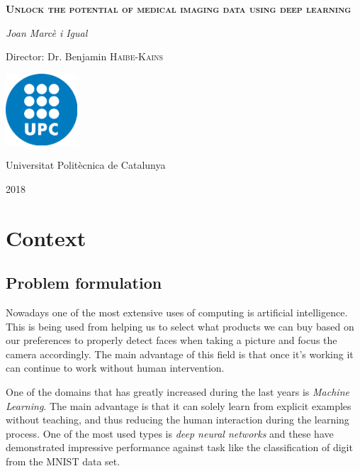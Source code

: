 \documentclass[a4paper]{article}
\begin{document}
\begin{titlepage}
    \centering
	\vspace{1.5cm}
	{\huge \textbf{\textsc{Unlock the potential of medical imaging data using deep learning}} \par}
	\vspace{2cm}
	{\Large\itshape Joan Marcè i Igual\par}
	\vfill
    Director: Dr. Benjamin \textsc{Haibe-Kains}
    
    \vfill

    \includegraphics[width=0.2\textwidth]{images/logo_upc}\par\vspace{1cm}
	\vfill
    
    {\LARGE Universitat Politècnica de Catalunya \par}
    {\LARGE 2018 \par}
\end{titlepage}

\tableofcontents

\section{Context}

\subsection{Problem formulation}

Nowadays one of the most extensive uses of computing is artificial intelligence. This is being
used from helping us to select what products we can buy based on our preferences to properly detect
faces when taking a picture and focus the camera accordingly. The main advantage of this field is
that once it's working it can continue to work without human intervention.

One of the domains that has greatly increased during the last years is \emph{Machine Learning}.
The main advantage is that it can solely learn from explicit examples without
teaching, and thus reducing the human interaction during the learning process. One of the most used
types is \emph{deep neural networks} and these have demonstrated impressive performance against
task like the classification of digit from the MNIST data set.
\cites{MNIST}{empirical-evaluation-deep-architectures}
\end{document}
